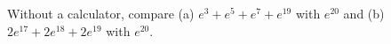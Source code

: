 Without a calculator, compare (a) $e^3+e^5+e^7+e^{19}$ with $e^{20}$ and (b) $2e^{17}+2e^{18}+2e^{19}$ with $e^{20}$.
